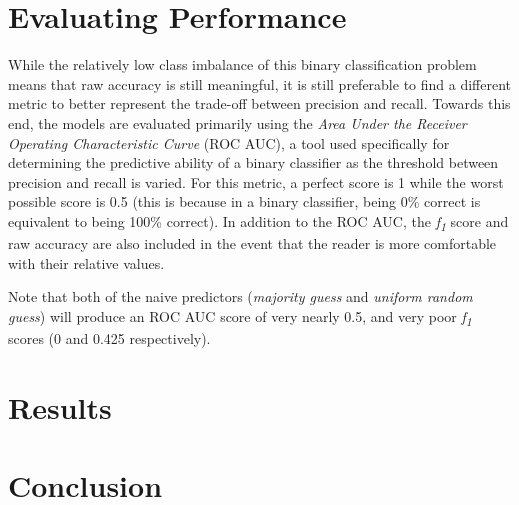 \documentclass[10pt,conference]{IEEEtran}
\begin{document}
\section{Evaluating Performance}
 While the relatively low class imbalance of this binary classification problem means that raw accuracy is still meaningful, it is still preferable to find a different metric to better represent the trade-off between precision and recall. Towards this end, the models are evaluated primarily using the \emph{Area Under the Receiver Operating Characteristic Curve} (ROC AUC), a tool used specifically for determining the predictive ability of a binary classifier as the threshold between precision and recall is varied\cite{Fawcett2006}. For this metric, a perfect score is 1 while the worst possible score is 0.5 (this is because in a binary classifier, being 0\% correct is equivalent to being 100\% correct). In addition to the ROC AUC, the \emph{f\textsubscript{1}} score\cite{rijsbergen_1995} and raw accuracy are also included in the event that the reader is more comfortable with their relative values.
 
 Note that both of the naive predictors (\emph{majority guess} and \emph{uniform random guess}) will produce an ROC AUC score of very nearly 0.5, and very poor \emph{f\textsubscript{1}} scores (0 and 0.425 respectively).
\section{Results}


\section{Conclusion}

\nocite{*}




\vspace{12pt}
\end{document}

